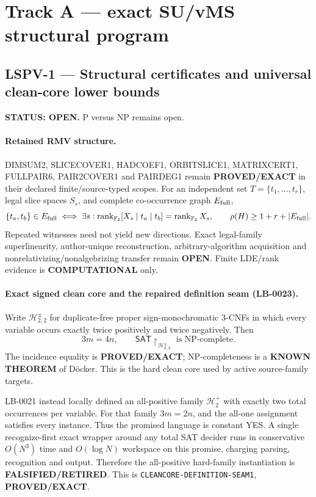 \documentclass[11pt]{article}
\begin{document}
\section{Track A --- exact SU/vMS structural program}

\subsection{LSPV-1 --- Structural certificates and universal clean-core lower bounds}

\textbf{STATUS: OPEN.} P versus NP remains open.

\paragraph{Retained RMV structure.}
DIMSUM2, SLICECOVER1, HADCOEF1, ORBITSLICE1, MATRIXCERT1,
FULLPAIR6, PAIR2COVER1 and PAIRDEG1 remain \textbf{PROVED/EXACT} in their
declared finite/source-typed scopes.  For an independent set
\(T=\{t_1,\ldots,t_r\}\), legal slice spaces \(S_s\), and complete
co-occurrence graph \(E_{\rm full}\),
\[
 \{t_a,t_b\}\in E_{\rm full}\iff
 \exists s:\operatorname{rank}_{\mathbb F_2}[X_s\mid t_a\mid t_b]
 =\operatorname{rank}_{\mathbb F_2}X_s,
 \qquad
 \rho(H)\ge 1+r+|E_{\rm full}|.
\]
Repeated witnesses need not yield new directions.  Exact legal-family
superlinearity, author-unique reconstruction, arbitrary-algorithm
acquisition and nonrelativizing/nonalgebrizing transfer remain
\textbf{OPEN}.  Finite LDE/rank evidence is \textbf{COMPUTATIONAL} only.

\paragraph{Exact signed clean core and the repaired definition seam (LB-0023).}
Write \(\mathcal H^{\pm}_{2,2}\) for duplicate-free proper
sign-monochromatic \(3\)-CNFs in which every variable occurs exactly twice
positively and twice negatively.  Then
\[
 3m=4n,\qquad
 \mathsf{SAT}\!\upharpoonright_{\mathcal H^{\pm}_{2,2}}
 \text{ is NP-complete}.
\]
The incidence equality is \textbf{PROVED/EXACT}; NP-completeness is a
\textbf{KNOWN THEOREM} of D\"ocker.  This is the hard clean core used by
active source-family targets.

LB-0021 instead locally defined an all-positive family
\(\mathcal H^+_2\) with exactly two total occurrences per variable.  For
that family \(3m=2n\), and the all-one assignment satisfies every instance.
Thus the promised language is constant YES.  A single recognize-first exact
wrapper around any total SAT decider runs in conservative \(O(N^3)\) time
and \(O(\log N)\) workspace on this promise, charging parsing, recognition
and output.  Therefore the all-positive hard-family instantiation is
\textbf{FALSIFIED/RETIRED}.  This is
\texttt{CLEANCORE-DEFINITION-SEAM1}, \textbf{PROVED/EXACT}.
\end{document}
